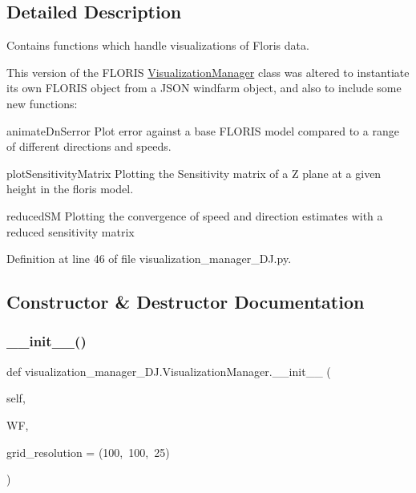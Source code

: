 \subsection{Detailed Description}
Contains functions which handle visualizations of Floris data. 

This version of the F\+L\+O\+R\+IS \mbox{\hyperlink{classvisualization__manager___d_j_1_1_visualization_manager}{Visualization\+Manager}} class was altered to instantiate its own F\+L\+O\+R\+IS object from a J\+S\+ON windfarm object, and also to include some new functions\+:


\begin{DoxyEnumerate}
\item animate\+Dn\+Serror Plot error against a base F\+L\+O\+R\+IS model compared to a range of different directions and speeds.
\item plot\+Sensitivity\+Matrix Plotting the Sensitivity matrix of a Z plane at a given height in the floris model.
\item reduced\+SM Plotting the convergence of speed and direction estimates with a reduced sensitivity matrix 
\end{DoxyEnumerate}

Definition at line 46 of file visualization\+\_\+manager\+\_\+\+D\+J.\+py.



\subsection{Constructor \& Destructor Documentation}
\mbox{\label{classvisualization__manager___d_j_1_1_visualization_manager_ac262d79ceedca2ca4dd92b078a0851f1}} 
\subsubsection{\texorpdfstring{\+\_\+\+\_\+init\+\_\+\+\_\+()}{\_\_init\_\_()}}
{\footnotesize\ttfamily def visualization\+\_\+manager\+\_\+\+D\+J.\+Visualization\+Manager.\+\_\+\+\_\+init\+\_\+\+\_\+ (\begin{DoxyParamCaption}\item[{}]{self,  }\item[{}]{WF,  }\item[{}]{grid\+\_\+resolution = {\ttfamily (100,~100,~25)} }\end{DoxyParamCaption})}



